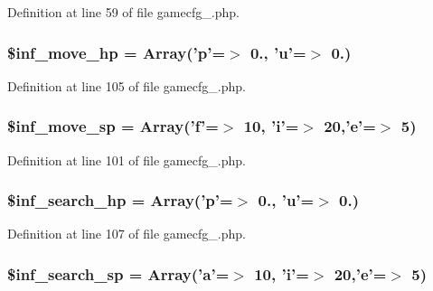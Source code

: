 Definition at line 59 of file gamecfg\+\_.\+php.

\hypertarget{gamecfg__1_8php_a129a85084499d20f3a06bb65ffd96afa}{
\subsubsection[{\$inf\+\_\+move\+\_\+hp}]{\setlength{\rightskip}{0pt plus 5cm}\$inf\+\_\+move\+\_\+hp = Array('p'=$>$ 0., 'u'=$>$ 0.)}}\label{gamecfg__1_8php_a129a85084499d20f3a06bb65ffd96afa}


Definition at line 105 of file gamecfg\+\_.\+php.

\hypertarget{gamecfg__1_8php_a8f9e2b10302dd8139d0a48e12b50aa34}{
\subsubsection[{\$inf\+\_\+move\+\_\+sp}]{\setlength{\rightskip}{0pt plus 5cm}\$inf\+\_\+move\+\_\+sp = Array('f'=$>$ 10, 'i'=$>$ 20,'e'=$>$ 5)}}\label{gamecfg__1_8php_a8f9e2b10302dd8139d0a48e12b50aa34}


Definition at line 101 of file gamecfg\+\_.\+php.

\hypertarget{gamecfg__1_8php_aa7bf96c31829f50f880615bfb21880e6}{
\subsubsection[{\$inf\+\_\+search\+\_\+hp}]{\setlength{\rightskip}{0pt plus 5cm}\$inf\+\_\+search\+\_\+hp = Array('p'=$>$ 0., 'u'=$>$ 0.)}}\label{gamecfg__1_8php_aa7bf96c31829f50f880615bfb21880e6}


Definition at line 107 of file gamecfg\+\_.\+php.

\hypertarget{gamecfg__1_8php_aac9419f8273e4ce38d3fdab56c41e730}{
\subsubsection[{\$inf\+\_\+search\+\_\+sp}]{\setlength{\rightskip}{0pt plus 5cm}\$inf\+\_\+search\+\_\+sp = Array('a'=$>$ 10, 'i'=$>$ 20,'e'=$>$ 5)}}\label{gamecfg__1_8php_aac9419f8273e4ce38d3fdab56c41e730}


